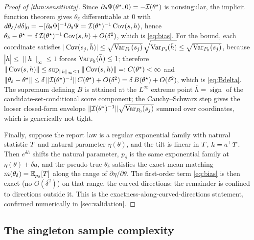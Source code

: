 \begin{proof}[Proof of \cref{thm:sensitivity}]
Since $\partial_\theta \Psi(\theta^\star, 0) = -\mathcal{I}(\theta^\star)$ is nonsingular,
the implicit function theorem gives $\theta_\delta$ differentiable at $0$ with
$d\theta_\delta/d\delta|_0 = -[\partial_\theta \Psi]^{-1} \partial_\delta \Psi =
\mathcal{I}(\theta^\star)^{-1} \operatorname{Cov}(s, h)$, hence
$\theta_\delta - \theta^\star = \delta\, \mathcal{I}(\theta^\star)^{-1} \operatorname{Cov}(s, h) +
O(\delta^2)$, which is \eqref{eq:bias}. For the bound, each coordinate satisfies
$|\operatorname{Cov}(s_j, \bar h)| \le \sqrt{\operatorname{Var}_{P_0}(s_j)}\, \sqrt{\operatorname{Var}_{P_0}(\bar h)} \le
\sqrt{\operatorname{Var}_{P_0}(s_j)}$, because $|\bar h| \le \|h\|_\infty \le 1$ forces
$\operatorname{Var}_{P_0}(\bar h) \le 1$; therefore $\|\operatorname{Cov}(s, h)\| \le \sup_{\|h\|_\infty \le 1}
\|\operatorname{Cov}(s, h)\| =: C(\theta^\star) < \infty$ and $\|\theta_\delta - \theta^\star\|
\le \delta\, \|\mathcal{I}(\theta^\star)^{-1}\|\, C(\theta^\star) + O(\delta^2) = \delta\,
B(\theta^\star) + O(\delta^2)$, which is \eqref{eq:Bdelta}. The supremum defining
$B$ is attained at the $L^\infty$ extreme point $\bar h = \operatorname{sign}$ of
the candidate-set-conditional score component; the Cauchy--Schwarz step gives the
looser closed-form envelope $\|\mathcal{I}(\theta^\star)^{-1}\| \sqrt{\operatorname{Var}_{P_0}(s_j)}$
summed over coordinates, which is generically not tight.

Finally, suppose the report law is a regular exponential family with natural
statistic $T$ and natural parameter $\eta(\theta)$, and the tilt is linear in
$T$, $h = a^\top T$. Then $e^{\delta h}$ shifts the natural parameter, $p_\delta$
is the same exponential family at $\eta(\theta) + \delta a$, and the pseudo-true
$\theta_\delta$
satisfies the exact mean-matching $m(\theta_\delta) = \mathbb{E}_{p_\delta}[T]$ along the
range of $\partial \eta / \partial \theta$. The first-order term \eqref{eq:bias} is
then exact (no $O(\delta^2)$) on that range, the curved directions; the remainder is
confined to directions outside it. This is the exactness-along-curved-directions
statement, confirmed numerically in \cref{sec:validation}.
\end{proof}

\subsection{The singleton sample complexity}
\label{app:restoration}

